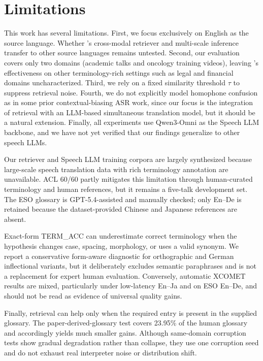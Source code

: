 \section*{Limitations}

This work has several limitations. 
First, we focus exclusively on English as the source language. Whether \method's cross-modal retriever and multi-scale inference transfer to other source languages remains untested. 
Second, our evaluation covers only two domains (academic talks and oncology training videos), leaving \method's effectiveness on other terminology-rich settings such as legal and financial domains uncharacterized. 
Third, we rely on a fixed similarity threshold $\tau$ to suppress retrieval noise.
Fourth, we do not explicitly model homophone confusion as in some prior contextual-biasing ASR work, since our focus is the integration of retrieval with an LLM-based simultaneous translation model, but it should be a natural extension. 
Finally, all experiments use Qwen3-Omni as the Speech LLM backbone, and we have not yet verified that our findings generalize to other speech LLMs.
\begin{crblock}
Our retriever and Speech LLM training corpora are largely synthesized because large-scale speech translation data with rich terminology annotation are unavailable. ACL 60/60 partly mitigates this limitation through human-curated terminology and human references, but it remains a five-talk development set. The ESO glossary is GPT-5.4-assisted and manually checked; only En--De is retained because the dataset-provided Chinese and Japanese references are absent.

Exact-form TERM\_ACC can underestimate correct terminology when the hypothesis changes case, spacing, morphology, or uses a valid synonym. We report a conservative form-aware diagnostic for orthographic and German inflectional variants, but it deliberately excludes semantic paraphrases and is not a replacement for expert human evaluation. Conversely, automatic XCOMET results are mixed, particularly under low-latency En--Ja and on ESO En--De, and should not be read as evidence of universal quality gains.

Finally, retrieval can help only when the required entry is present in the supplied glossary. The paper-derived-glossary test covers 23.95\% of the human glossary and accordingly yields much smaller gains. Although same-domain corruption tests show gradual degradation rather than collapse, they use one corruption seed and do not exhaust real interpreter noise or distribution shift.
\end{crblock}
